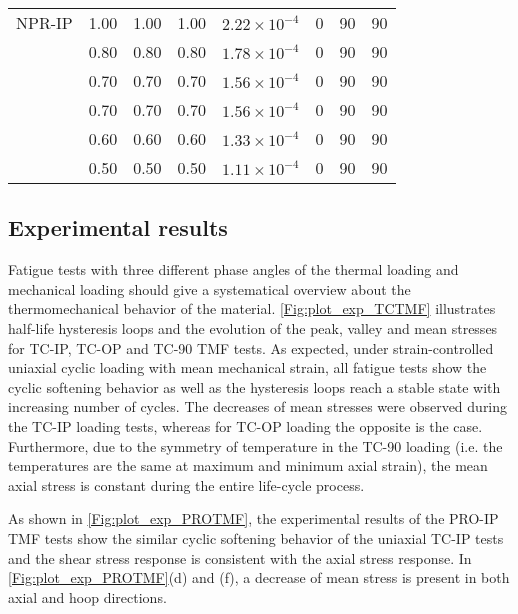 \begin{table}[htbp]
\begin{tabular}{p{2cm}p{1.5cm}p{1.5cm}p{1.5cm}p{2.5cm}p{1cm}p{1cm}p{1cm}}
    NPR-IP & 1.00  & 1.00  & 1.00  & $2.22\times 10^{-4}$ & 0     & 90    & 90 \\
          & 0.80  & 0.80  & 0.80  & $1.78\times 10^{-4}$ & 0     & 90    & 90 \\
          & 0.70  & 0.70  & 0.70  & $1.56\times 10^{-4}$ & 0     & 90    & 90 \\
          & 0.70  & 0.70  & 0.70  & $1.56\times 10^{-4}$ & 0     & 90    & 90 \\
          & 0.60  & 0.60  & 0.60  & $1.33\times 10^{-4}$ & 0     & 90    & 90 \\
          & 0.50  & 0.50  & 0.50  & $1.11\times 10^{-4}$ & 0     & 90    & 90 \\
    \bottomrule
    \end{tabular}%
  \label{tab:test_program_tmf}%
\end{table}%

\subsection{Experimental results}
\noindent
Fatigue tests with three different phase angles of the thermal loading and mechanical loading should give a systematical overview about the thermomechanical behavior of the material. \ref{Fig:plot_exp_TCTMF} illustrates half-life hysteresis loops and the evolution of the peak, valley and mean stresses for TC-IP, TC-OP and TC-90 TMF tests. As expected, under strain-controlled uniaxial cyclic loading with mean mechanical strain, all fatigue tests show the cyclic softening behavior as well as the hysteresis loops reach a stable state with increasing number of cycles. The decreases of mean stresses were observed during the TC-IP loading tests, whereas for TC-OP loading the opposite is the case. Furthermore, due to the symmetry of temperature in the TC-90 loading (i.e. the temperatures are the same at maximum and minimum axial strain), the mean axial stress is constant during the entire life-cycle process.

As shown in \ref{Fig:plot_exp_PROTMF}, the experimental results of the PRO-IP TMF tests show the similar cyclic softening behavior of the uniaxial TC-IP tests and the shear stress response is consistent with the axial stress response. In \ref{Fig:plot_exp_PROTMF}(d) and (f), a decrease of mean stress is present in both axial and hoop directions.

